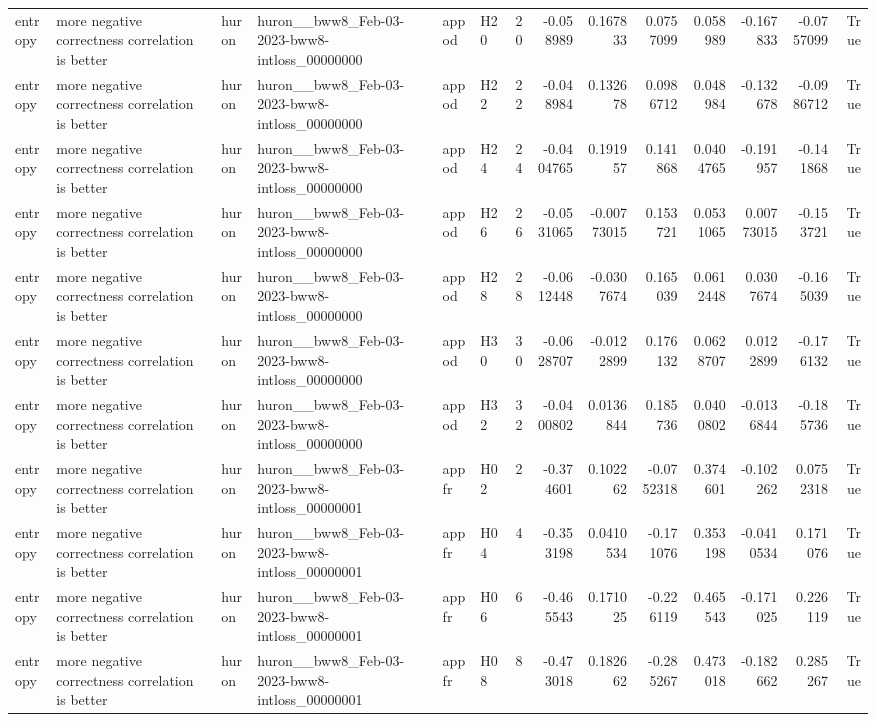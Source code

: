 \begin{longtable}{llllllrrrrrrrr}
entropy & more negative correctness correlation is better & huron & huron\_\_bww8\_Feb-03-2023-bww8-intloss\_00000000 & appod & H20 & 20 & -0.058989 & 0.167833 & 0.0757099 & 0.058989 & -0.167833 & -0.0757099 & True \\
entropy & more negative correctness correlation is better & huron & huron\_\_bww8\_Feb-03-2023-bww8-intloss\_00000000 & appod & H22 & 22 & -0.048984 & 0.132678 & 0.0986712 & 0.048984 & -0.132678 & -0.0986712 & True \\
entropy & more negative correctness correlation is better & huron & huron\_\_bww8\_Feb-03-2023-bww8-intloss\_00000000 & appod & H24 & 24 & -0.0404765 & 0.191957 & 0.141868 & 0.0404765 & -0.191957 & -0.141868 & True \\
entropy & more negative correctness correlation is better & huron & huron\_\_bww8\_Feb-03-2023-bww8-intloss\_00000000 & appod & H26 & 26 & -0.0531065 & -0.00773015 & 0.153721 & 0.0531065 & 0.00773015 & -0.153721 & True \\
entropy & more negative correctness correlation is better & huron & huron\_\_bww8\_Feb-03-2023-bww8-intloss\_00000000 & appod & H28 & 28 & -0.0612448 & -0.0307674 & 0.165039 & 0.0612448 & 0.0307674 & -0.165039 & True \\
entropy & more negative correctness correlation is better & huron & huron\_\_bww8\_Feb-03-2023-bww8-intloss\_00000000 & appod & H30 & 30 & -0.0628707 & -0.0122899 & 0.176132 & 0.0628707 & 0.0122899 & -0.176132 & True \\
entropy & more negative correctness correlation is better & huron & huron\_\_bww8\_Feb-03-2023-bww8-intloss\_00000000 & appod & H32 & 32 & -0.0400802 & 0.0136844 & 0.185736 & 0.0400802 & -0.0136844 & -0.185736 & True \\
entropy & more negative correctness correlation is better & huron & huron\_\_bww8\_Feb-03-2023-bww8-intloss\_00000001 & appfr & H02 & 2 & -0.374601 & 0.102262 & -0.0752318 & 0.374601 & -0.102262 & 0.0752318 & True \\
entropy & more negative correctness correlation is better & huron & huron\_\_bww8\_Feb-03-2023-bww8-intloss\_00000001 & appfr & H04 & 4 & -0.353198 & 0.0410534 & -0.171076 & 0.353198 & -0.0410534 & 0.171076 & True \\
entropy & more negative correctness correlation is better & huron & huron\_\_bww8\_Feb-03-2023-bww8-intloss\_00000001 & appfr & H06 & 6 & -0.465543 & 0.171025 & -0.226119 & 0.465543 & -0.171025 & 0.226119 & True \\
entropy & more negative correctness correlation is better & huron & huron\_\_bww8\_Feb-03-2023-bww8-intloss\_00000001 & appfr & H08 & 8 & -0.473018 & 0.182662 & -0.285267 & 0.473018 & -0.182662 & 0.285267 & True \\

\end{longtable}

